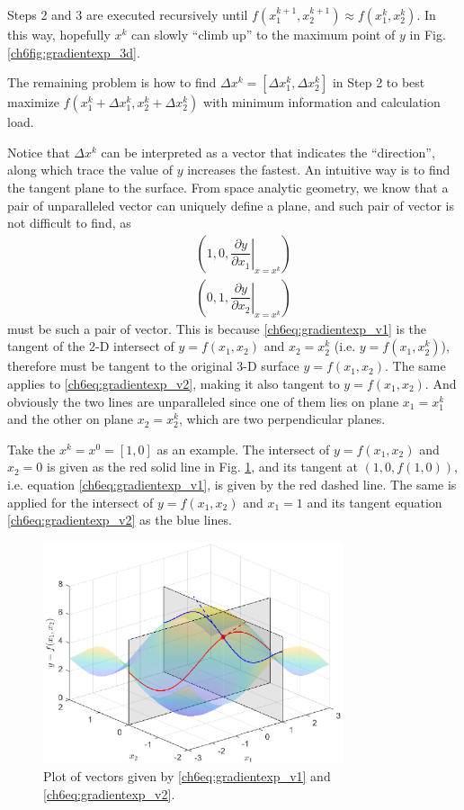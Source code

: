 Steps 2 and 3 are executed recursively until $f(x_1^{k+1}, x_2^{k+1}) \approx f(x_1^k, x_2^k)$. In this way, hopefully $x^k$ can slowly ``climb up'' to the maximum point of $y$ in Fig. \ref{ch6fig:gradientexp_3d}.

The remaining problem is how to find $\Delta x^k = [\Delta x_1^k, \Delta x_2^k]$ in Step 2 to best maximize $f(x_1^k+\Delta x_1^k, x_2^k+\Delta x_2^k)$ with minimum information and calculation load. 

Notice that $\Delta x^k$ can be interpreted as a vector that indicates the ``direction'', along which trace the value of $y$ increases the fastest. An intuitive way is to find the tangent plane to the surface. From space analytic geometry, we know that a pair of unparalleled vector can uniquely define a plane, and such pair of vector is not difficult to find, as
\begin{eqnarray}
  && \left(1,0,\left.\dfrac{\partial y}{\partial x_1}\right|_{x=x^k}\right) \label{ch6eq:gradientexp_v1} \\
  && \left(0,1,\left.\dfrac{\partial y}{\partial x_2}\right|_{x=x^k}\right) \label{ch6eq:gradientexp_v2}
\end{eqnarray}
must be such a pair of vector. This is because \eqref{ch6eq:gradientexp_v1} is the tangent of the 2-D intersect of $y=f(x_1,x_2)$ and $x_2 = x_2^k$ (i.e. $y=f(x_1,x_2^k)$), therefore must be tangent to the original 3-D surface $y=f(x_1,x_2)$. The same applies to \eqref{ch6eq:gradientexp_v2}, making it also tangent to $y=f(x_1,x_2)$. And obviously the two lines are unparalleled since one of them lies on plane $x_1=x_1^k$ and the other on plane $x_2=x_2^k$, which are two perpendicular planes.

Take the $x^k=x^0=[1,0]$ as an example. The intersect of $y=f(x_1,x_2)$ and $x_2 = 0$ is given as the red solid line in Fig. \ref{ch6fig:gradientexp_3d2}, and its tangent at $\left(1,0,f(1,0)\right)$, i.e. equation \eqref{ch6eq:gradientexp_v1}, is given by the red dashed line. The same is applied for the intersect of $y=f(x_1,x_2)$ and $x_1 = 1$ and its tangent equation \eqref{ch6eq:gradientexp_v2} as the blue lines.

\begin{figure}
	\centering
	\includegraphics[width=250pt]{chapters/chapter6/figures/gradientexp_3d2.eps}
	\caption{Plot of vectors given by \eqref{ch6eq:gradientexp_v1} and \eqref{ch6eq:gradientexp_v2}.} \label{ch6fig:gradientexp_3d2}
\end{figure}

